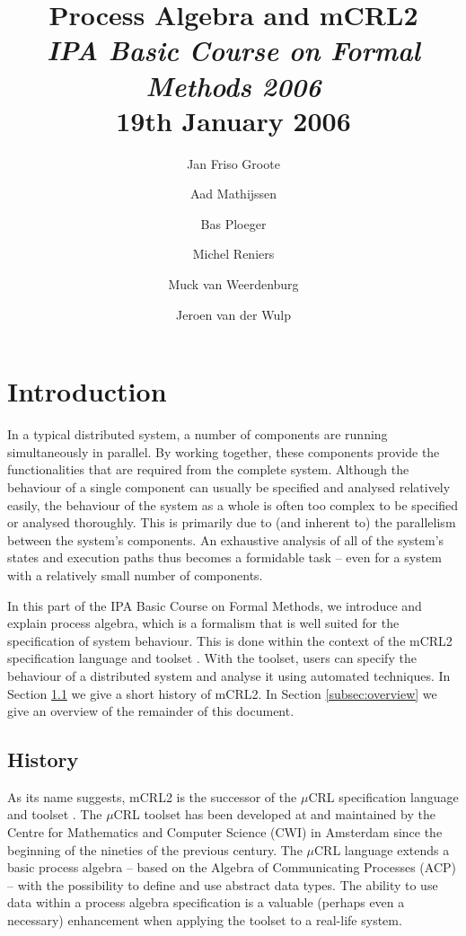 \documentclass[a4paper,fleqn]{article}
\title{Process Algebra and mCRL2\\
\emph{\large IPA Basic Course on Formal Methods 2006}\\
{\normalsize 19th January 2006}}
\author{Jan Friso Groote \and Aad Mathijssen \and Bas Ploeger \and Michel
Reniers \and Muck van Weerdenburg \and Jeroen van der Wulp}
\date{}
\newcommand{\frm}[1]{\mbox{\ensuremath{#1}}}
\newcommand{\mCRL}{\frm{\mu}CRL\xspace}
\begin{document}
\maketitle

\section{Introduction}
\label{sec:introduction}

In a typical distributed system, a number of components are running
simultaneously in parallel. By working together, these components provide the
functionalities that are required from the complete system. Although the
behaviour of a single component can usually be specified and analysed relatively
easily, the behaviour of the system as a whole is often too complex to be
specified or analysed thoroughly. This is primarily due to (and inherent to) the
parallelism between the system's components. An exhaustive analysis of all of
the system's states and execution paths thus becomes a formidable task -- even
for a system with a relatively small number of components.

In this part of the IPA Basic Course on Formal Methods, we introduce and explain
process algebra, which is a formalism that is well suited for the specification
of system behaviour. This is done within the context of the mCRL2 specification
language \cite{Groote et al 2005} and toolset \cite{mCRL2 toolset}. With the
toolset, users can specify the behaviour of a distributed system and analyse it
using automated techniques. In Section \ref{subsec:history} we give a short
history of mCRL2. In Section \ref{subsec:overview} we give an overview of the
remainder of this document.

\subsection{History}
\label{subsec:history}

As its name suggests, mCRL2 is the successor of the \mCRL specification language
and toolset \cite{Groote 1997, Groote Ponse 1994, Groote Reniers 2001}. The
\mCRL toolset has been developed at and maintained by the Centre for Mathematics
and Computer Science (CWI) in Amsterdam since the beginning of the nineties of
the previous century. The \mCRL language extends a basic process algebra --
based on the Algebra of Communicating Processes (ACP) \cite{Baeten Weijland
1990} -- with the possibility to define and use abstract data types.  The
ability to use data within a process algebra specification is a valuable
(perhaps even a necessary) enhancement when applying the toolset to a real-life
system.
\end{document}
